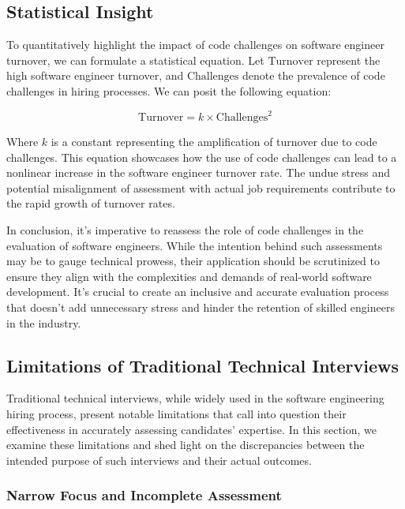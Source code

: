 \documentclass[
    a4paper, %
    10pt, %
    unnumberedsections, %
    twoside, %
]{LTJournalArticle}
\begin{document}
\subsection{Statistical Insight}

To quantitatively highlight the impact of code challenges on software engineer turnover, we can formulate a statistical equation. Let $\text{Turnover}$ represent the high software engineer turnover, and $\text{Challenges}$ denote the prevalence of code challenges in hiring processes. We can posit the following equation:

\begin{equation}
    \text{Turnover} = k \times \text{Challenges}^2
\end{equation}


Where $k$ is a constant representing the amplification of turnover due to code challenges. This equation showcases how the use of code challenges can lead to a nonlinear increase in the software engineer turnover rate. The undue stress and potential misalignment of assessment with actual job requirements contribute to the rapid growth of turnover rates.



In conclusion, it's imperative to reassess the role of code challenges in the evaluation of software engineers. While the intention behind such assessments may be to gauge technical prowess, their application should be scrutinized to ensure they align with the complexities and demands of real-world software development. It's crucial to create an inclusive and accurate evaluation process that doesn't add unnecessary stress and hinder the retention of skilled engineers in the industry.


\subsection{Limitations of Traditional Technical Interviews}

Traditional technical interviews, while widely used in the software engineering hiring process, present notable limitations that call into question their effectiveness in accurately assessing candidates' expertise. In this section, we examine these limitations and shed light on the discrepancies between the intended purpose of such interviews and their actual outcomes.

\subsubsection*{Narrow Focus and Incomplete Assessment}
\end{document}
